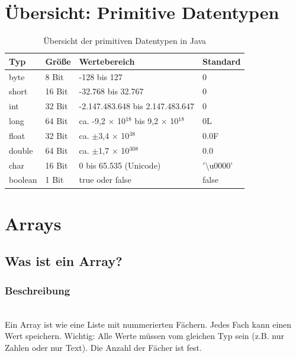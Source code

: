 \newpage


\section*{Übersicht: Primitive Datentypen}

\begin{table}[h]
	\centering
	\begin{tabular}{|l|l|l|l|}
		\hline
		\textbf{Typ} & \textbf{Größe} & \textbf{Wertebereich} & \textbf{Standard} \\
		\hline
		byte & 8 Bit & -128 bis 127 & 0 \\
		\hline
		short & 16 Bit & -32.768 bis 32.767 & 0 \\
		\hline
		int & 32 Bit & -2.147.483.648 bis 2.147.483.647 & 0 \\
		\hline
		long & 64 Bit & ca. -9,2 $\times$ 10$^{18}$ bis 9,2 $\times$ 10$^{18}$ & 0L \\
		\hline
		float & 32 Bit & ca. $\pm$3,4 $\times$ 10$^{38}$ & 0.0F \\
		\hline
		double & 64 Bit & ca. $\pm$1,7 $\times$ 10$^{308}$ & 0.0 \\
		\hline
		char & 16 Bit & 0 bis 65.535 (Unicode) & \('\)\textbackslash u0000' \\
		\hline
		boolean & 1 Bit & true oder false & false \\
		\hline
	\end{tabular}
	\caption{Übersicht der primitiven Datentypen in Java}
\end{table}


\section*{Arrays}

\subsection*{Was ist ein Array?}

\subsubsection*{Beschreibung}\\
Ein Array ist wie eine Liste mit nummerierten Fächern. Jedes Fach kann einen Wert speichern.
Wichtig: Alle Werte müssen vom gleichen Typ sein (z.B. nur Zahlen oder nur Text). Die Anzahl der Fächer ist fest.


